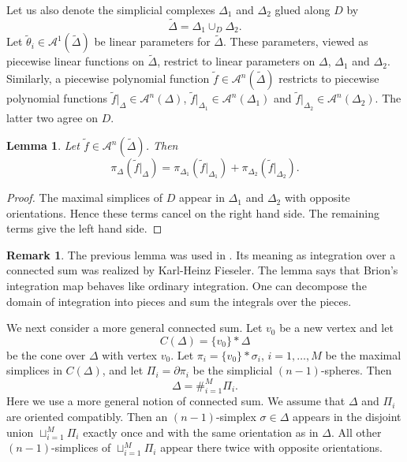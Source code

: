 \documentclass[10pt]{article}
\newtheorem{lemma}[theorem]{Lemma}
\theoremstyle{definition}
\newtheorem{rema}[theorem]{Remark}
\newcommand{\cA}{{\mathcal A}}
\begin{document}
  Let us also denote the simplicial complexes $\Delta_1$ and  $\Delta_2$ glued along $D$ by 
\[ \tilde{\Delta} = \Delta_1 \cup_D \Delta_2.\]
Let $\tilde{\theta}_i \in \cA^1(\tilde\Delta)$ be linear parameters for $\tilde{\Delta}$. These parameters, viewed as piecewise linear functions on $\tilde{\Delta}$, restrict to linear parameters on $\Delta$, $\Delta_1$ and $\Delta_2$. Similarly, a piecewise polynomial function $\tilde{f} \in \cA^n(\tilde{\Delta})$ restricts to piecewise polynomial functions $\tilde{f}|_\Delta \in \cA^n(\Delta)$,  $\tilde{f}|_{\Delta_1} \in \cA^n(\Delta_1)$ and $\tilde{f}|_{\Delta_2} \in \cA^n(\Delta_2)$. The latter two agree on $D$.

\begin{lemma} 
Let $\tilde{f} \in \cA^n(\tilde{\Delta})$. Then
\[ \pi_{\Delta} (\tilde{f}|_\Delta) = \pi_{\Delta_1}(\tilde{f}|_{\Delta_1}) + \pi_{\Delta_2}(\tilde{f}|_{\Delta_2}).\]
\end{lemma} 

\begin{proof} 
The maximal simplices of $D$ appear in $\Delta_1$ and $\Delta_2$ with opposite orientations. Hence these terms cancel on the right hand side. The remaining terms give the left hand side.
\end{proof}

\begin{rema} 
The  previous lemma was used in \cite{Karu, BL2, BBFK2}. Its meaning as integration over a connected sum was realized by Karl-Heinz Fieseler. The lemma says that Brion's integration map behaves like ordinary integration. One can decompose the domain of integration into pieces and sum the integrals over the pieces.
\end{rema}

We next consider a more general connected sum. Let $v_0$ be a new vertex and let 
\[ C(\Delta) = \{v_0\} * \Delta \]
be the cone over $\Delta$ with vertex $v_0$.  Let $\pi_i = \{v_0\} * \sigma_i$, $i=1,\ldots,M$ be the maximal simplices in $C(\Delta)$, and let $\Pi_i = \partial \pi_i$ be the simplicial $(n-1)$-spheres. Then
\[ \Delta = \#_{i=1}^M \Pi_i.\]
Here we use a more general notion of connected sum. We assume that $\Delta$ and $\Pi_i$ are oriented compatibly. Then an $(n-1)$-simplex $\sigma \in \Delta$ appears in the disjoint union $\sqcup_{i=1}^M \Pi_i$ exactly once and with the same orientation as in $\Delta$. All other $(n-1)$-simplices of  $\sqcup_{i=1}^M \Pi_i$ appear there twice with opposite orientations.
\end{document}
